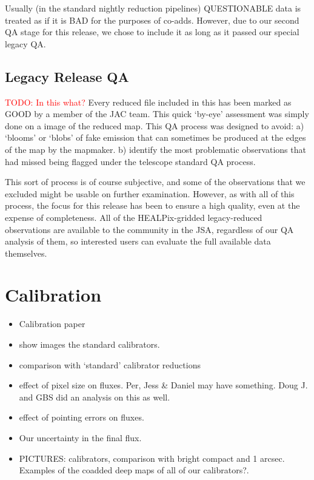 \documentclass[usenatbib]{mnras}
\newcommand{\todo}[1]{\textcolor{red}{TODO: #1}}
\newcommand{\status}[1]{\textsf{#1}}
\begin{document}
Usually (in the standard nightly reduction pipelines)
\status{QUESTIONABLE} data is treated as if it is \status{BAD} for the
purposes of co-adds. However, due to our second QA stage for this
release, we chose to include it as long as it passed our special
legacy QA.

\subsection{Legacy Release QA}

\todo{In this what?}
Every reduced file included in this has been marked as \status{GOOD}
by a member of the JAC team. This quick `by-eye' assessment was simply
done on a image of the reduced map. This QA process was designed to
avoid: a) `blooms' or `blobs' of fake emission that can sometimes be
produced at the edges of the map by the mapmaker.  b) identify the
most problematic observations that had missed being flagged under the
telescope standard QA process.

This sort of process is of course subjective, and some of the
observations that we excluded might be usable on further
examination. However, as with all of this process, the focus for this
release has been to ensure a high quality, even at the expense
of completeness. All of the HEALPix-gridded legacy-reduced
observations are available to the community in the JSA, regardless of
our QA analysis of them, so interested users can evaluate the full
available data themselves.


\section{Calibration}

\begin{itemize}
\item Calibration paper \citep{Dempsey2013}
\item show images the standard calibrators.
\item comparison with `standard' calibrator reductions
\item effect of pixel size on fluxes. Per, Jess \& Daniel may have
  something. Doug J. and GBS did an analysis on this as well.
\item effect of pointing errors on fluxes.
\item Our uncertainty in the final flux.

\item PICTURES: calibrators, comparison with bright compact and 1
  arcsec. Examples of the coadded deep maps of all of our
  calibrators?.
\end{itemize}
\end{document}
